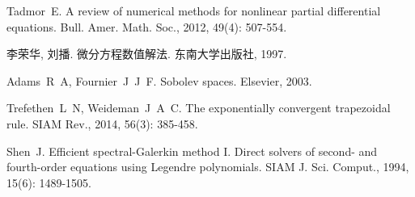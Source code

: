 \documentclass[cn,12pt]{homework}
\begin{document}


\begin{thebibliography}{99}
 Tadmor~E. A review of numerical methods for nonlinear partial differential equations\allowbreak[J]. Bull. Amer. Math. Soc., 2012, 49(4): 507-554.

 李荣华, 刘播. 微分方程数值解法\allowbreak[M]. 东南大学出版社, 1997.

 Adams~R~A, Fournier~J~J~F. Sobolev spaces\allowbreak[M]. Elsevier, 2003.

 Trefethen~L~N, Weideman~J~A~C. The exponentially convergent trapezoidal rule\allowbreak[J]. SIAM Rev., 2014, 56(3): 385-458.

 Shen~J. Efficient spectral-Galerkin method I. Direct solvers of second- and fourth-order equations using Legendre polynomials\allowbreak[J]. SIAM J. Sci. Comput., 1994, 15(6): 1489-1505.

\end{thebibliography}
\end{document}
